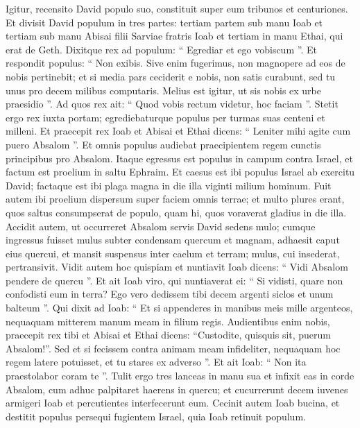\begin{biblechapter}
\begin{biblechapter}
\begin{biblechapter}
\begin{biblechapter}
\begin{biblechapter}
\begin{biblechapter}
\begin{biblechapter}
\begin{biblechapter}
\begin{biblechapter}
\begin{biblechapter}
\begin{biblechapter}
\begin{biblechapter}
\begin{biblechapter}
\begin{biblechapter}
\begin{biblechapter}
\begin{biblechapter}
\begin{biblechapter}
\begin{biblechapter}
\verse Igitur, recensito David populo suo, constituit super eum tribunos et centuriones. 
\verse Et divisit David populum in tres partes: tertiam partem sub manu Ioab et tertiam sub manu Abisai filii Sarviae fratris Ioab et tertiam in manu Ethai, qui erat de Geth. Dixitque rex ad populum: “ Egrediar et ego vobiscum ”. 
\verse Et respondit populus: “ Non exibis. Sive enim fugerimus, non magnopere ad eos de nobis pertinebit; et si media pars ceciderit e nobis, non satis curabunt, sed tu unus pro decem milibus computaris. Melius est igitur, ut sis nobis ex urbe praesidio ”. 
\verse Ad quos rex ait: “ Quod vobis rectum videtur, hoc faciam ”. Stetit ergo rex iuxta portam; egrediebaturque populus per turmas suas centeni et milleni. 
\verse Et praecepit rex Ioab et Abisai et Ethai dicens: “ Leniter mihi agite cum puero Absalom ”. Et omnis populus audiebat praecipientem regem cunctis principibus pro Absalom.
 \verse Itaque egressus est populus in campum contra Israel, et factum est proelium in saltu Ephraim. 
\verse Et caesus est ibi populus Israel ab exercitu David; factaque est ibi plaga magna in die illa viginti milium hominum. 
\verse Fuit autem ibi proelium dispersum super faciem omnis terrae; et multo plures erant, quos saltus consumpserat de populo, quam hi, quos voraverat gladius in die illa.
 \verse Accidit autem, ut occurreret Absalom servis David sedens mulo; cumque ingressus fuisset mulus subter condensam quercum et magnam, adhaesit caput eius quercui, et mansit suspensus inter caelum et terram; mulus, cui insederat, pertransivit. 
\verse Vidit autem hoc quispiam et nuntiavit Ioab dicens: “ Vidi Absalom pendere de quercu ”.
 \verse Et ait Ioab viro, qui nuntiaverat ei: “ Si vidisti, quare non confodisti eum in terra? Ego vero dedissem tibi decem argenti siclos et unum balteum ”. 
\verse Qui dixit ad Ioab: “ Et si appenderes in manibus meis mille argenteos, nequaquam mitterem manum meam in filium regis. Audientibus enim nobis, praecepit rex tibi et Abisai et Ethai dicens: “Custodite, quisquis sit, puerum Absalom!”. 
\verse Sed et si fecissem contra animam meam infideliter, nequaquam hoc regem latere potuisset, et tu stares ex adverso ”. 
\verse Et ait Ioab: “ Non ita praestolabor coram te ”. Tulit ergo tres lanceas in manu sua et infixit eas in corde Absalom, cum adhuc palpitaret haerens in quercu; 
\verse et cucurrerunt decem iuvenes armigeri Ioab et percutientes interfecerunt eum.
 \verse Cecinit autem Ioab bucina, et destitit populus persequi fugientem Israel, quia Ioab retinuit populum. 

\end{biblechapter}
\end{biblechapter}
\end{biblechapter}
\end{biblechapter}
\end{biblechapter}
\end{biblechapter}
\end{biblechapter}
\end{biblechapter}
\end{biblechapter}
\end{biblechapter}
\end{biblechapter}
\end{biblechapter}
\end{biblechapter}
\end{biblechapter}
\end{biblechapter}
\end{biblechapter}
\end{biblechapter}
\end{biblechapter}

